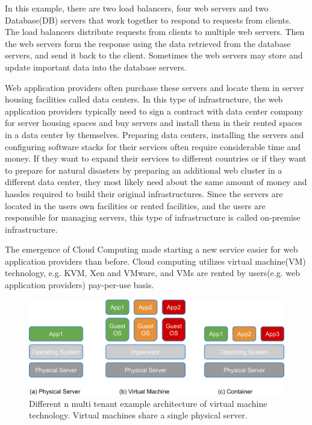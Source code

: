 In this example, there are two load balancers, four web servers and two Database(DB) servers that work together to respond to requests from clients.
The load balancers distribute requests from clients to multiple web servers. 
Then the web servers form the response using the data retrieved from the database servers, and send it back to the client.
Sometimes the web servers may store and update important data into the database servers.

Web application providers often purchase these servers and locate them in server housing facilities called data centers.
In this type of infrastructure, the web application providers typically need to sign a contract with data center company for server housing spaces and buy servers and install them in their rented spaces in a data center by themselves.
Preparing data centers, installing the servers and configuring software stacks for their services often require considerable time and money.
If they want to expand their services to different countries or if they want to prepare for natural disasters by preparing an additional web cluster in a different data center, they most likely need about the same amount of money and hassles required to build their original infrastructures.
Since the servers are located in the users own facilities or rented facilities, and the users are responsible for managing servers, this type of infrastructure is called on-premise infrastructure.

The emergence of Cloud Computing made starting a new service easier for web application providers than before.
Cloud computing utilizes virtual machine(VM) technology, e.g. KVM, Xen and VMware, and VMs are rented by users(e.g. web application providers) pay-per-use basis.
\begin{figure}[h]
\begin{center}
\includegraphics[width=0.8\columnwidth]{Figs/physical_vm_container.png}
\end{center}
\caption{
Different n multi tenant example architecture of virtual machine technology. Virtual machines share a single physical server.
}
\label{fig:physical_vm_container}
\end{figure}

